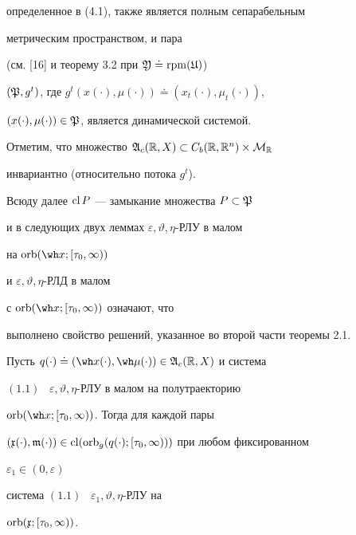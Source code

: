определенное в (4.1), также является полным сепарабельным


метрическим пространством, и пара


(см. [16] и теорему 3.2 при $\frak Y\doteq\operatorname{rpm}(\frak U)$)


$(\frak P,g^t)$, где $g^t(x(\cdot),\mu(\cdot))


\doteq(x_t(\cdot),\mu_t(\cdot))$,


$(x(\cdot),\mu(\cdot))\in\frak P$, является динамической системой.


Отметим, что множество $\frak A_c(\Bbb R,X)


\subset C_b(\Bbb R,\Bbb R^n)\times\cal M_{\Bbb R}$


инвариантно (относительно потока $g^t$).





Всюду далее $\operatorname{cl} P$ --- замыкание множества $P\subset\frak P$


и в следующих двух леммах $\varepsilon,\vartheta,\eta$-РЛУ в малом


на $\orb(\wh x;[\tau_0,\infty))$


и $\varepsilon,\vartheta,\eta$-РЛД в малом


с $\orb(\wh x;[\tau_0,\infty))$ означают, что


выполнено свойство решений, указанное во второй части теоремы 2.1.








\begin{lems}


Пусть $q(\cdot)\doteq(\wh x(\cdot),


\wh\mu(\cdot))\in\frak A_c(\Bbb R,X)$ и система


$(1.1)$ \ $\varepsilon,\vartheta,\eta$-РЛУ в малом на полутраекторию


$\orb(\wh x;[\tau_0,\infty))$. Тогда для каждой пары


$(\frak x(\cdot),\frak m(\cdot))


\in\cl(\orb_g(q(\cdot);[\tau_0,\infty)))$ при любом фиксированном


$\varepsilon_1\in(0,\varepsilon)$


система $(1.1)$ \ $\varepsilon_1,\vartheta,\eta$-РЛУ на


$\operatorname{orb}(\frak x;[\tau_0,\infty))$.


\end{lems}








